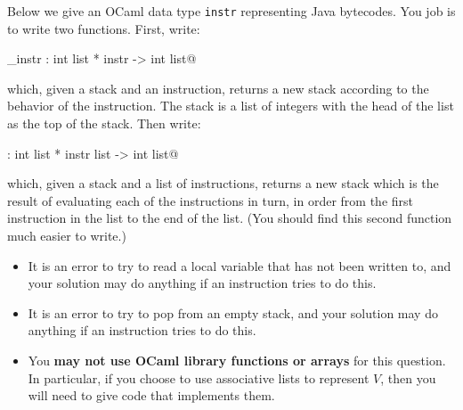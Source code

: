 \documentclass[11pt]{article}
\begin{document}
\begin{enumerate}
      \smallskip

      Below we give an OCaml data type \texttt{instr}
      representing Java bytecodes.  You job is to write two functions.
      First, write:

      \vspace{-5mm}

      \begin{center}

        \verb@eval_instr : int list * instr -> int list@

      \end{center}

      \vspace{-2mm}

      which, given a stack and an instruction, returns a new stack
      according to the behavior of the instruction.  The stack is a
      list of integers with the head of the list as the top of the
      stack.  Then write:

      \vspace{-2.75mm}

      \begin{center}

        \verb@eval : int list * instr list -> int list@

      \end{center}

      \vspace{-2.5mm}

      which, given a stack and a list of instructions, returns a new
      stack which is the result of evaluating each of the
      instructions in turn, in order from the first instruction in the
      list to the end of the list.  (You should find this second function
      much easier to write.)

      \vspace{-2.75mm}

      \begin{itemize}
      \item It is an error to try to read a local variable that has
        not been written to, and your solution may do anything if an
        instruction tries to do this.

      \item It is an error to try to pop from an empty stack, and your
        solution may do anything if an instruction tries to do this.

      \item You \textbf{may not use OCaml library functions or arrays}
        for this question.  In particular, if you choose to use associative
        lists to represent $V$, then you will need to give code that
        implements them.
      \end{itemize}


\end{enumerate}
\end{document}
